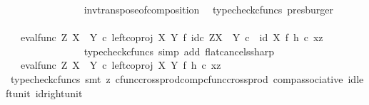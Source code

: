\begin{isabellebody}
\ \ \ \ \ \ \ \ \ \ \ \ \ \ \isamarkupfalse%
\ inv{\isacharunderscore}{\kern0pt}transpose{\isacharunderscore}{\kern0pt}of{\isacharunderscore}{\kern0pt}composition\ \isamarkupfalse%
\ {\isacharparenleft}{\kern0pt}typecheck{\isacharunderscore}{\kern0pt}cfuncs{\isacharcomma}{\kern0pt}\ presburger{\isacharparenright}{\kern0pt}\isanewline
\ \ \ \ \ \ \ \ \ \ \ \ \isamarkupfalse%
\ \isamarkupfalse%
\ {\isachardoublequoteopen}{\isachardot}{\kern0pt}{\isachardot}{\kern0pt}{\isachardot}{\kern0pt}\ {\isacharequal}{\kern0pt}\ {\isacharparenleft}{\kern0pt}{\isacharparenleft}{\kern0pt}eval{\isacharunderscore}{\kern0pt}func\ Z\ {\isacharparenleft}{\kern0pt}X\ {\isasymCoprod}\ Y{\isacharparenright}{\kern0pt}\ {\isasymcirc}\isactrlsub c\ left{\isacharunderscore}{\kern0pt}coproj\ X\ Y\ {\isasymtimes}\isactrlsub f\ id\isactrlsub c\ {\isacharparenleft}{\kern0pt}Z\isactrlbsup {\isacharparenleft}{\kern0pt}X\ {\isasymCoprod}\ Y{\isacharparenright}{\kern0pt}\isactrlesup {\isacharparenright}{\kern0pt}{\isacharparenright}{\kern0pt}\ {\isasymcirc}\isactrlsub c\ \ {\isacharparenleft}{\kern0pt}id\ X\ {\isasymtimes}\isactrlsub f\ h{\isacharparenright}{\kern0pt}{\isacharparenright}{\kern0pt}\ {\isasymcirc}\isactrlsub c\ {\isasymlangle}x{\isacharcomma}{\kern0pt}z{\isasymrangle}{\isachardoublequoteclose}\isanewline
\ \ \ \ \ \ \ \ \ \ \ \ \ \ \isamarkupfalse%
\ {\isacharparenleft}{\kern0pt}typecheck{\isacharunderscore}{\kern0pt}cfuncs{\isacharcomma}{\kern0pt}\ simp\ add{\isacharcolon}{\kern0pt}\ flat{\isacharunderscore}{\kern0pt}cancels{\isacharunderscore}{\kern0pt}sharp{\isacharparenright}{\kern0pt}\isanewline
\ \ \ \ \ \ \ \ \ \ \ \ \isamarkupfalse%
\ \isamarkupfalse%
\ {\isachardoublequoteopen}{\isachardot}{\kern0pt}{\isachardot}{\kern0pt}{\isachardot}{\kern0pt}\ {\isacharequal}{\kern0pt}\ {\isacharparenleft}{\kern0pt}eval{\isacharunderscore}{\kern0pt}func\ Z\ {\isacharparenleft}{\kern0pt}X\ {\isasymCoprod}\ Y{\isacharparenright}{\kern0pt}\ {\isasymcirc}\isactrlsub c\ left{\isacharunderscore}{\kern0pt}coproj\ X\ Y\ {\isasymtimes}\isactrlsub f\ h{\isacharparenright}{\kern0pt}\ {\isasymcirc}\isactrlsub c\ {\isasymlangle}x{\isacharcomma}{\kern0pt}z{\isasymrangle}{\isachardoublequoteclose}\isanewline
\ \ \ \ \ \ \ \ \ \ \ \ \ \ \isamarkupfalse%
\ {\isacharparenleft}{\kern0pt}typecheck{\isacharunderscore}{\kern0pt}cfuncs{\isacharcomma}{\kern0pt}\ smt\ {\isacharparenleft}{\kern0pt}z{}{\isacharparenright}{\kern0pt}\ cfunc{\isacharunderscore}{\kern0pt}cross{\isacharunderscore}{\kern0pt}prod{\isacharunderscore}{\kern0pt}comp{\isacharunderscore}{\kern0pt}cfunc{\isacharunderscore}{\kern0pt}cross{\isacharunderscore}{\kern0pt}prod\ comp{\isacharunderscore}{\kern0pt}associative{}\ id{\isacharunderscore}{\kern0pt}left{\isacharunderscore}{\kern0pt}unit{}\ id{\isacharunderscore}{\kern0pt}right{\isacharunderscore}{\kern0pt}unit{}{\isacharparenright}{\kern0pt}\isanewline

\end{isabellebody}
